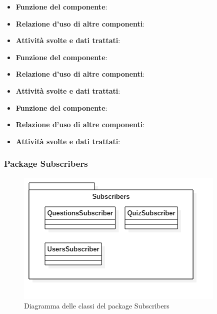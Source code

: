 \begin{itemize}
	\item\textbf{Funzione del componente}: 
	\item\textbf{Relazione d'uso di altre componenti}: 
	\item\textbf{Attività svolte e dati trattati}:
\end{itemize}


\begin{itemize}
	\item\textbf{Funzione del componente}: 
	\item\textbf{Relazione d'uso di altre componenti}: 
	\item\textbf{Attività svolte e dati trattati}:
\end{itemize}


\begin{itemize}
	\item\textbf{Funzione del componente}: 
	\item\textbf{Relazione d'uso di altre componenti}: 
	\item\textbf{Attività svolte e dati trattati}:
\end{itemize}

			\subsubsection{Package Subscribers}
\begin{figure}[h!]
\begin{center}
	\includegraphics[scale=0.65]{../images/SubscribersClass.png}
	\caption{Diagramma delle classi del package Subscribers}
\end{center}
\end{figure}

